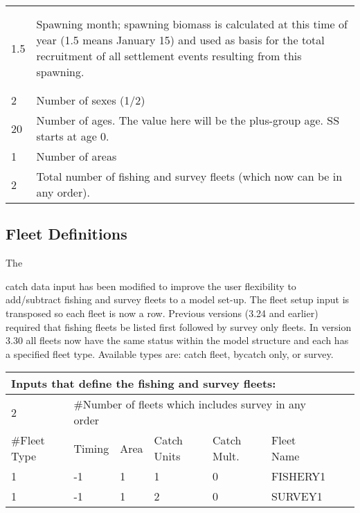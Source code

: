 \begin{center}
\begin{tabular}{p{4cm} p{12cm}}
			& \\
			& \\
			\hline
			\hypertarget{RecrTiminig}{1.5} & \multirow{1}{1cm}[-0.1cm]{\parbox{12cm}{Spawning month; spawning biomass is calculated at this time of year (1.5 means January 15) and used as basis for the total recruitment of all settlement events resulting from this spawning.}}\\
			& \\
			& \\
			\hline
			2 & Number of sexes (1/2) \\
			\hline
			20 & Number of ages. The value here will be the plus-group age.  SS starts at age 0. \\
			\hline
			1 & Number of areas \\
			\hline
			2 & Total number of fishing and survey fleets (which now can be in any order).\\
			\hline
	\end{tabular}
\end{center}


\subsection{Fleet Definitions }
\hypertarget{GenericFleets}{The} catch data input has been modified to improve the user flexibility to add/subtract fishing and survey fleets to a model set-up.  The fleet setup input is transposed so each fleet is now a row.  Previous versions (3.24 and earlier) required that fishing fleets be listed first followed by survey only fleets.  In version 3.30 all fleets now have the same status within the model structure and each has a specified fleet type.  Available types are: catch fleet, bycatch only, or survey.  

\begin{center}
	\begin{tabular}{p{2cm} p{2cm} p{2cm} p{2cm} p{2cm} p{2cm} p{2cm} p{2.5cm}}
		\multicolumn{6}{l}{Inputs that define the fishing and survey fleets:}\\
		\hline
		2 & \multicolumn{5}{l}{\#Number of fleets which includes survey in any order} \\
		\hline
		\#Fleet Type & Timing & Area & Catch Units & Catch Mult. & Fleet Name \\

		\hline
		1 & -1 & 1 & 1 & 0 & FISHERY1\\
		1 & -1 & 1 & 2 & 0 & SURVEY1\\
		\hline
		
	\end{tabular}
\end{center}

